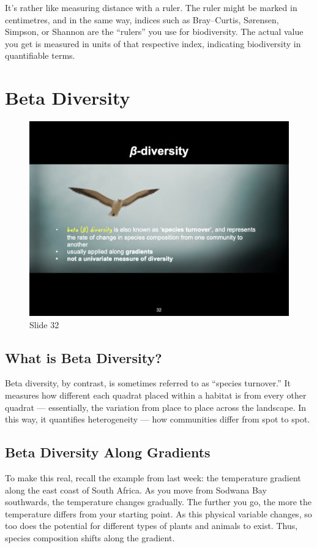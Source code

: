 \documentclass[
  10pt,
]{book}
\begin{document}
It's rather like measuring distance with a ruler. The ruler might be
marked in centimetres, and in the same way, indices such as
Bray--Curtis, Sørensen, Simpson, or Shannon are the ``rulers'' you use
for biodiversity. The actual value you get is measured in units of that
respective index, indicating biodiversity in quantifiable terms.

\section{Beta Diversity}\label{beta-diversity}

\begin{figure}[ht]
\centering
\includegraphics[width=0.8\linewidth]{../images/BDC334/BDC334-032.jpeg}
\caption*{Slide 32}
\end{figure}

\subsection{What is Beta Diversity?}\label{what-is-beta-diversity}

Beta diversity, by contrast, is sometimes referred to as ``species
turnover.'' It measures how different each quadrat placed within a
habitat is from every other quadrat --- essentially, the variation from
place to place across the landscape. In this way, it quantifies
heterogeneity --- how communities differ from spot to spot.

\subsection{Beta Diversity Along
Gradients}\label{beta-diversity-along-gradients}

To make this real, recall the example from last week: the temperature
gradient along the east coast of South Africa. As you move from Sodwana
Bay southwards, the temperature changes gradually. The further you go,
the more the temperature differs from your starting point. As this
physical variable changes, so too does the potential for different types
of plants and animals to exist. Thus, species composition shifts along
the gradient.
\end{document}
